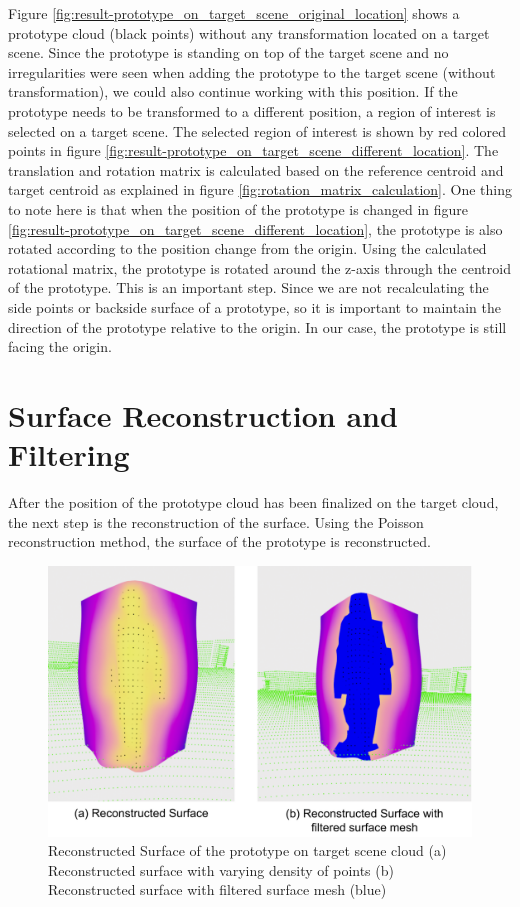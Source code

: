 Figure \ref{fig:result-prototype_on_target_scene_original_location} shows a prototype cloud (black points) without any transformation located on a target scene. Since the prototype is standing on top of the target scene and no irregularities were seen when adding the prototype to the target scene (without transformation), we could also continue working with this position. If the prototype needs to be transformed to a different position, a region of interest is selected on a target scene. The selected region of interest is shown by red colored points in figure \ref{fig:result-prototype_on_target_scene_different_location}. The translation and rotation matrix is calculated based on the reference centroid and target centroid as explained in figure \ref{fig:rotation_matrix_calculation}. One thing to note here is that when the position of the prototype is changed in figure \ref{fig:result-prototype_on_target_scene_different_location}, the prototype is also rotated according to the position change from the origin. Using the calculated rotational matrix, the prototype is rotated around the z-axis through the centroid of the prototype. This is an important step. Since we are not recalculating the side points or backside surface of a prototype, so it is important to maintain the direction of the prototype relative to the origin. In our case, the prototype is still facing the origin.

\section{Surface Reconstruction and Filtering}
After the position of the prototype cloud has been finalized on the target cloud, the next step is the reconstruction of the surface. Using the Poisson reconstruction method, the surface of the prototype is reconstructed.

\begin{figure}[htbp]
    \centering
    \includegraphics[width=1\linewidth]{97_graphics/results/surface_reconstruction.pdf}
    \caption{Reconstructed Surface of the prototype on target scene cloud (a) Reconstructed surface with varying density of points (b) Reconstructed surface with filtered surface mesh (blue)}
    \label{fig:result-surface_reconstruction}
\end{figure}

